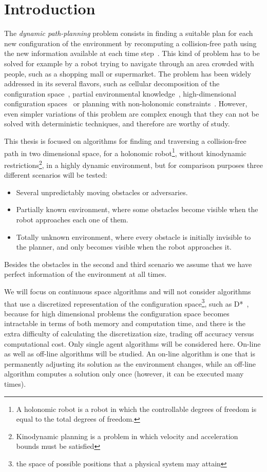 \chapter{Introduction}
The \emph{dynamic path-planning} problem consists in finding a suitable
plan for each new configuration of the environment by recomputing a
collision-free path using the new information available at each time step~\cite{Hwang92}.
This kind of problem has to be solved for example by a robot trying to navigate
through an area crowded with people, such as a shopping mall or supermarket.
The problem has been widely addressed in its several flavors,
such as cellular decomposition of the configuration space~\cite{Stentz95},
partial environmental knowledge~\cite{Stentz94},
high-dimensional configuration spaces~\cite{Kavraki96}
or planning with non-holonomic constraints~\cite{Lavalle99}.
However, even simpler variations of this problem are complex enough
that they can not be solved
with deterministic techniques, and therefore are worthy of study.

This thesis is focused on algorithms for
finding and traversing a collision-free path in
two dimensional space, for a
holonomic robot\footnote{A holonomic robot is a robot in
which the controllable degrees of freedom is equal to the total degrees of
freedom.},
without kinodynamic restrictions\footnote{Kinodynamic planning is a problem in which velocity and acceleration
bounds must be satisfied}, in a highly dynamic environment, but for comparison
purposes three different scenarios will be tested:
\begin{itemize}
\item Several unpredictably moving obstacles or adversaries.
\item Partially known environment, where some obstacles become visible when the
robot approaches each one of them.
\item Totally unknown environment, where every obstacle is initially invisible
to the planner, and only becomes visible when the robot approaches it.
\end{itemize}
Besides the obstacles in the second and third scenario we assume
that we have perfect information of the environment at all times.

We will focus on continuous space algorithms and
will not consider algorithms that use a discretized representation of the
configuration space\footnote{the space of possible positions that a physical
system may attain}, such
as D*~\cite{Stentz95},
because for high dimensional problems the
configuration space becomes intractable in terms of both memory and computation
time, and there is the extra difficulty of calculating the discretization size,
trading off accuracy versus computational cost.
Only single agent algorithms will be considered here.
On-line as well as off-line algorithms will be studied. An on-line algorithm is
one that is permanently adjusting its solution as the environment changes, while
an off-line algorithm computes a solution only once (however, it can be executed 
many times).

